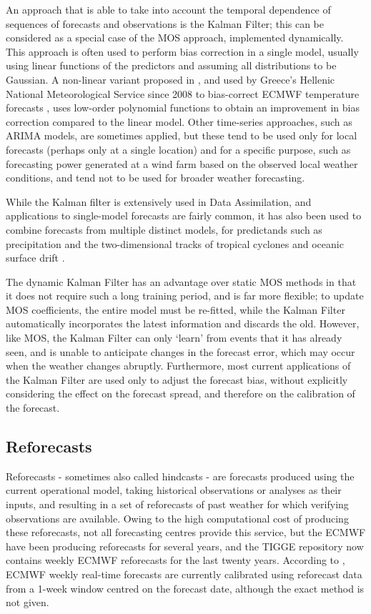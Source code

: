 \documentclass[10pt,fleqn]{article}
\begin{document}
An approach that is able to take into account the temporal dependence of sequences of forecasts and observations is the Kalman Filter; this can be considered as a special case of the MOS approach, implemented dynamically. This approach is often used to perform bias correction in a single model, usually using  linear functions of the predictors and assuming all distributions to be Gaussian. A non-linear variant proposed in \cite{Galanis2006}, and used by Greece's Hellenic National Meteorological Service since 2008 to bias-correct ECMWF temperature forecasts \cite{GreenBook2016}, uses low-order polynomial functions to obtain an improvement in bias correction compared to the linear model. Other time-series approaches, such as ARIMA models, are sometimes applied, but these tend to be used only for local forecasts (perhaps only at a single location) and for a specific purpose, such as forecasting power generated at a wind farm based on the observed local weather conditions, and tend not to be used for broader weather forecasting.

While the Kalman filter is extensively used in Data Assimilation, and applications to single-model forecasts are fairly common, it has also been used to combine forecasts from multiple distinct models, for predictands such as precipitation \cite{Shin2003} and the two-dimensional tracks of tropical cyclones \cite{He2015} and oceanic surface drift \cite{Rixen2009, Vandenbulcke2009}.

The dynamic Kalman Filter has an advantage over static MOS methods in that it does not require such a long training period, and is far more flexible; to update MOS coefficients, the entire model must be re-fitted, while the Kalman Filter automatically incorporates the latest information and discards the old. However, like MOS, the Kalman Filter can only `learn' from events that it has already seen, and is unable to anticipate changes in the forecast error, which may occur when the weather changes abruptly. Furthermore, most current applications of the Kalman Filter are used only to adjust the forecast bias, without explicitly considering the effect on the forecast spread, and therefore on the calibration of the forecast. 



\subsection*{Reforecasts}

Reforecasts - sometimes also called hindcasts - are forecasts produced using the current operational model, taking historical observations or analyses as their inputs, and resulting in a set of reforecasts of past weather for which verifying observations are available. Owing to the high computational cost of producing these reforecasts, not all forecasting centres provide this service, but the ECMWF have been producing reforecasts for several years, and the TIGGE repository now contains weekly ECMWF reforecasts for the last twenty years. According to \cite{ECMWFReforecasts}, ECMWF weekly real-time forecasts are currently calibrated using reforecast data from a 1-week window centred on the forecast date, although the exact method is not given.
\end{document}
